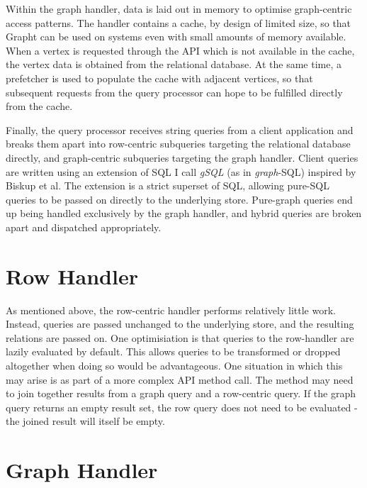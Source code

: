 Within the graph handler, data is laid out in memory to optimise graph-centric
access patterns. The handler contains a cache, by design of limited size, so
that Grapht can be used on systems even with small amounts of memory
available. When a vertex is requested through the API which is not available
in the cache, the vertex data is obtained from the relational database. At the
same time, a prefetcher is used to populate the cache with adjacent vertices,
so that subsequent requests from the query processor can hope to be fulfilled
directly from the cache.

Finally, the query processor receives string queries from a client application
and breaks them apart into row-centric subqueries targeting the relational
database directly, and graph-centric subqueries targeting the graph handler.
Client queries are written using an extension of SQL I call \textit{gSQL} (as
in \textit{graph}-SQL) inspired by Biskup et al\cite{gSQL}. The extension is a
strict superset of SQL, allowing pure-SQL queries to be passed on directly to
the underlying store. Pure-graph queries end up being handled exclusively by
the graph handler, and hybrid queries are broken apart and dispatched
appropriately.






\section{Row Handler}

As mentioned above, the row-centric handler performs relatively little work.
Instead, queries are passed unchanged to the underlying store, and the
resulting relations are passed on. One optimisiation is that queries to the
row-handler are  lazily evaluated by default. This allows queries to be
transformed or dropped altogether when doing so would be advantageous. One
situation in which this may arise is as part of a more complex API method
call. The method may need to join together results from a graph query and a
row-centric query. If the graph query returns an empty result set, the  row
query does not need to be evaluated - the joined result will itself be empty.






\section{Graph Handler}
\label{impl:graph}

